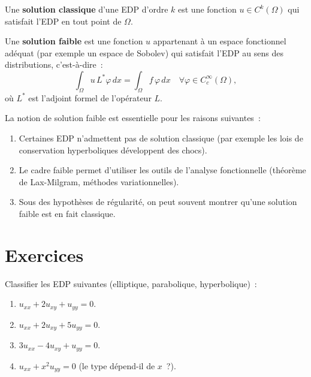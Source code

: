 \begin{definition}
Une \textbf{solution classique} d'une EDP d'ordre $k$ est une fonction
$u \in C^k(\Omega)$ qui satisfait l'EDP en tout point de $\Omega$.
\end{definition}

\begin{definition}
Une \textbf{solution faible} est une fonction $u$ appartenant \`a un espace
fonctionnel ad\'equat (par exemple un espace de Sobolev) qui satisfait
l'EDP au sens des distributions, c'est-\`a-dire~:
\[
    \int_\Omega u\, L^*\varphi\, dx = \int_\Omega f\, \varphi\, dx
    \quad \forall \varphi \in C_c^\infty(\Omega),
\]
o\`u $L^*$ est l'adjoint formel de l'op\'erateur $L$.
\end{definition}

\begin{remarque}
La notion de solution faible est essentielle pour les raisons suivantes~:
\begin{enumerate}
    \item Certaines EDP n'admettent pas de solution classique (par exemple
          les lois de conservation hyperboliques d\'eveloppent des chocs).
    \item Le cadre faible permet d'utiliser les outils de l'analyse fonctionnelle
          (th\'eor\`eme de Lax-Milgram, m\'ethodes variationnelles).
    \item Sous des hypoth\`eses de r\'egularit\'e, on peut souvent montrer qu'une
          solution faible est en fait classique.
\end{enumerate}
\end{remarque}

\section{Exercices}

\begin{exercice}
Classifier les EDP suivantes (elliptique, parabolique, hyperbolique)~:
\begin{enumerate}
    \item $u_{xx} + 2u_{xy} + u_{yy} = 0$.
    \item $u_{xx} + 2u_{xy} + 5u_{yy} = 0$.
    \item $3u_{xx} - 4u_{xy} + u_{yy} = 0$.
    \item $u_{xx} + x^2 u_{yy} = 0$ (le type d\'epend-il de $x$~?).
\end{enumerate}
\end{exercice}

